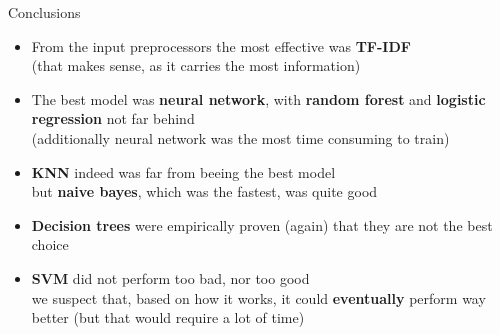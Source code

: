 \documentclass{beamer}
\begin{document}
\begin{frame}[t]{Conclusions}
\begin{itemize}[<+->]
	\item From the input preprocessors the most effective was {\bf TF-IDF} \\
	(that makes sense, as it carries the most information)
	\item The best model was {\bf neural network}, with {\bf random forest} and {\bf logistic regression} not far behind \\
	(additionally neural network was the most time consuming to train)
	\item {\bf KNN} indeed was far from beeing the best model \\
	but {\bf naive bayes}, which was the fastest, was quite good
	\item {\bf Decision trees} were empirically proven (again) that they are not the best choice
	\item {\bf SVM} did not perform too bad, nor too good \\
	we suspect that, based on how it works, it could {\bf eventually} perform way better (but that would require a lot of time)
\end{itemize}
\end{frame}

\begin{frame}
\end{frame}
\end{document}
